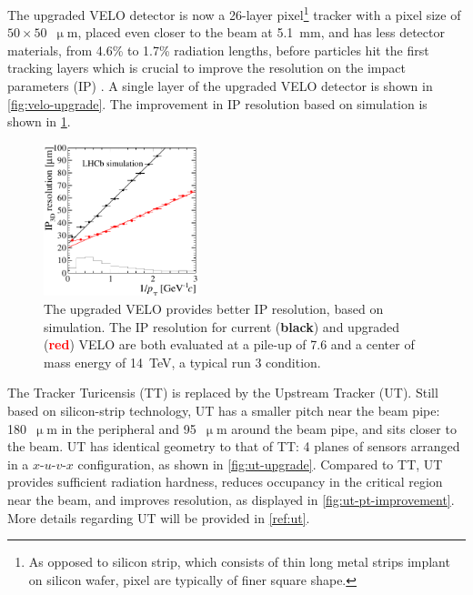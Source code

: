 The upgraded VELO detector is now a 26-layer pixel\footnote{
    As opposed to silicon strip, which consists of thin long metal strips
    implant on silicon wafer,
    pixel are typically of finer square shape.
} tracker with a pixel size of $50 \times 50$~$\upmu$m,
placed even closer to the beam at 5.1~mm,
and has less detector materials, from 4.6\% to 1.7\% radiation lengths, before
particles hit the first tracking layers which is crucial to improve the
resolution on the impact parameters (IP) \cite{Hennessy_2017}.
A single layer of the upgraded VELO detector is shown in
\cref{fig:velo-upgrade}.
The improvement in IP resolution based on simulation is shown in
\cref{fig:velo-ip-improvement}.

\begin{figure}[!htb]
    \centering
    \includegraphics[width=0.4\textwidth]{./figs-lhcb-upgrade-overview/tracking/velo_ip_improvement.pdf}
    \caption{
        The upgraded VELO provides better IP resolution, based on simulation.
        The IP resolution for current (\textbf{black}) and upgraded
        (\textcolor{red}{\textbf{red}})
        VELO are both evaluated at a
        pile-up of 7.6 and a center of mass energy of 14~TeV, a typical run 3
        condition.
    }
    \label{fig:velo-ip-improvement}
\end{figure}

The Tracker Turicensis (TT) is replaced by the Upstream Tracker (UT).
Still based on silicon-strip technology, UT has a smaller pitch near the beam
pipe:
180~$\upmu$m in the peripheral and 95~$\upmu$m around the beam pipe,
and sits closer to the beam.
UT has identical geometry to that of TT:
4 planes of sensors arranged in a $x$-$u$-$v$-$x$ configuration,
as shown in \cref{fig:ut-upgrade}.
Compared to TT, UT provides sufficient radiation hardness,
reduces occupancy in the critical region near the beam, and improves
\pt resolution, as displayed in \cref{fig:ut-pt-improvement}.
More details regarding UT will be provided in \cref{ref:ut}.

